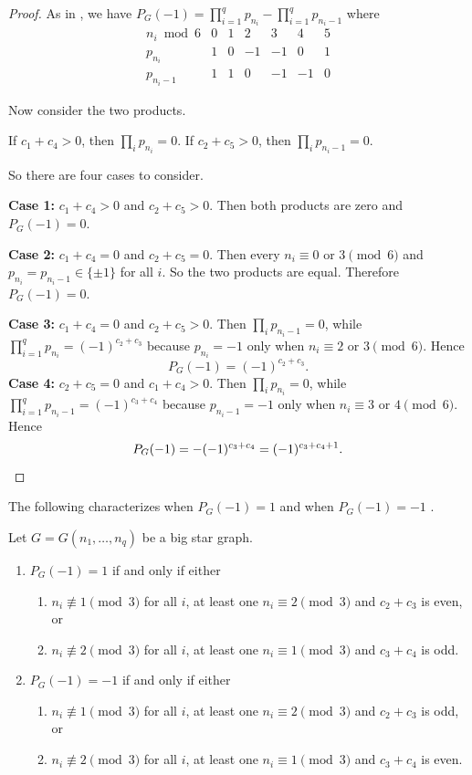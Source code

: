 \documentclass[12pt]{amsart}
\theoremstyle{plain}
\theoremstyle{definition}
\begin{document}
\begin{proof}
As in  , we have \(P_G(-1)=\prod_{i=1}^q p_{n_i}-\prod_{i=1}^q p_{n_i-1}\)
where 
\[
\begin{array}{c|cccccc}
n_i \bmod 6 & 0 & 1 & 2 & 3 & 4 & 5\\ \hline
p_{n_i} & 1 & 0 & -1 & -1 & 0 & 1\\
p_{n_i-1} & 1 & 1 & 0 & -1 & -1 & 0
\end{array}
\]

Now consider the two products.

If \(c_1+c_4>0\), then \(\prod_i p_{n_i}=0\).  
If \(c_2+c_5>0\), then \(\prod_i p_{n_i-1}=0\).

So there are four cases to consider.


\textbf{Case 1:} \(c_1+c_4>0\) and \(c_2+c_5>0\).  
Then both products are zero and \(P_G(-1)=0\).

\textbf{Case 2:} \(c_1+c_4=0\) and \(c_2+c_5=0\).  
Then every \(n_i\equiv 0\) or \(3\pmod 6\) and $p_{n_i}=p_{n_i-1}\in\{\pm1\}$
for all \(i\). So the two products are equal. Therefore \(P_G(-1)=0\).

\textbf{Case 3:} \(c_1+c_4=0\) and \(c_2+c_5>0\).  
Then \(\prod_i p_{n_i-1}=0\), while
\(
\prod_{i=1}^q p_{n_i}=(-1)^{c_2+c_3}\)
because \(p_{n_i}=-1\) only when \(n_i\equiv 2\) or \(3\pmod 6\). Hence
\[
P_G(-1)=(-1)^{c_2+c_3}.
\]
\textbf{Case 4:} \(c_2+c_5=0\) and \(c_1+c_4>0\).  
Then \(\prod_i p_{n_i}=0\), while
\(\prod_{i=1}^q p_{n_i-1}=(-1)^{c_3+c_4}\)
because \(p_{n_i-1}=-1\) only  when \(n_i\equiv 3\) or \(4\pmod 6\). Hence
\[
P_G(-1)=-(-1)^{c_3+c_4}=(-1)^{c_3+c_4+1}. \qedhere
\]
\end{proof}

The following characterizes when  $P_G(-1)=1$ and when $P_G(-1)=-1$ .

\begin{cor}\label{cor:big_star_pm1_sign}
Let \(G=G(n_1,\ldots,n_q)\) be a big star graph.

    \begin{enumerate}    
    \item \(P_G(-1)=1\) if and only if either
    \begin{enumerate}
        \item \(n_i\not\equiv 1\pmod 3\) for all \(i\), at least one \(n_i\equiv 2\pmod 3\) and \(
        c_2+c_3 \) is even, or
        \item \(n_i\not\equiv 2\pmod 3\) for all \(i\), at least one \(n_i\equiv 1\pmod 3\) and \(c_3+c_4\)
 is odd.
    \end{enumerate}
 
     \item \(P_G(-1)=-1\) if and only if either
    \begin{enumerate}
        \item \(n_i\not\equiv 1\pmod 3\) for all \(i\), at least one \(n_i\equiv 2\pmod 3\) and \( c_2+c_3 \)
is odd, or
        \item \(n_i\not\equiv 2\pmod 3\) for all \(i\), at least one \(n_i\equiv 1\pmod 3\) and \( c_3+c_4 \) is even.
    \end{enumerate}
        \end{enumerate}
\end{cor}
\end{document}
